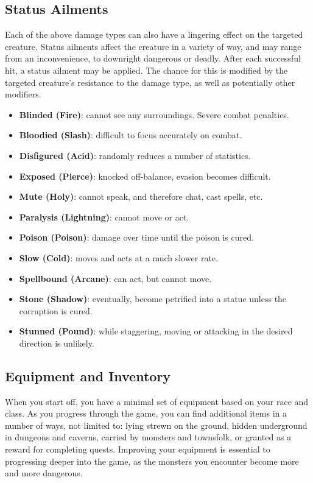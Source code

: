 \subsection{Status Ailments}

Each of the above damage types can also have a lingering effect on the
targeted creature.  Status ailments affect the creature in a variety of
way, and may range from an inconvenience, to downright dangerous or
deadly.  After each successful hit, a status ailment may be applied.  The
chance for this is modified by the targeted creature's resistance to the
damage type, as well as potentially other modifiers.

\begin{itemize}
\item {\bf Blinded (Fire)}: cannot see any surroundings.  Severe combat 
penalties.
\item {\bf Bloodied (Slash)}: difficult to focus accurately on combat.  
\item {\bf Disfigured (Acid)}: randomly reduces a number of statistics.
\item {\bf Exposed (Pierce)}: knocked off-balance, evasion becomes 
difficult.  
\item {\bf Mute (Holy)}: cannot speak, and therefore chat, cast spells, 
etc.
\item {\bf Paralysis (Lightning)}: cannot move or act.
\item {\bf Poison (Poison)}: damage over time until the poison is cured.
\item {\bf Slow (Cold)}: moves and acts at a much slower rate.
\item {\bf Spellbound (Arcane)}: can act, but cannot move.
\item {\bf Stone (Shadow)}: eventually, become petrified into a statue 
unless the corruption is cured.
\item {\bf Stunned (Pound)}: while staggering, moving or attacking in the 
desired direction is unlikely.
\end{itemize}

\subsection{Equipment and Inventory}

When you start off, you have a minimal set of equipment based on your race
and class.  As you progress through the game, you can find additional items
in a number of ways, not limited to: lying strewn on the ground, hidden 
underground in dungeons and caverns, carried by monsters and townsfolk, or 
granted as a reward for completing quests.  Improving your equipment is
essential to progressing deeper into the game, as the monsters you encounter
become more and more dangerous.

